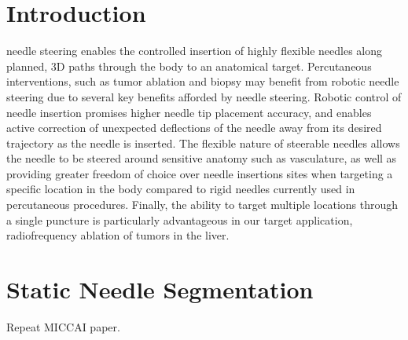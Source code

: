 \documentclass[journal,transmag]{IEEEtran}
\begin{document}
\IEEEdisplaynontitleabstractindextext




%
\IEEEpeerreviewmaketitle



\section{Introduction}
 needle steering enables the controlled insertion of highly flexible needles along planned, 3D paths through the body to an anatomical target. Percutaneous interventions, such as tumor ablation and biopsy may benefit from robotic needle steering due to several key benefits afforded by needle steering. Robotic control of  needle insertion promises higher needle tip placement accuracy, and enables active correction of unexpected deflections of the needle away from its desired trajectory as the needle is inserted. The flexible nature of steerable needles allows the needle to be steered around sensitive anatomy such as vasculature, as well as providing greater freedom of choice over needle insertions sites when targeting a specific location in the body compared to rigid needles currently used in percutaneous procedures. Finally, the ability to target multiple locations through a single puncture is particularly advantageous in our target application, radiofrequency ablation of tumors in the liver.

\section{Static Needle Segmentation}
Repeat MICCAI paper.
\end{document}

